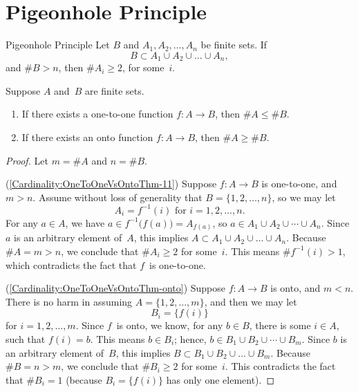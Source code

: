 \documentclass[../MATH-2000-Notes.tex]{subfiles}
\begin{document}
\section{Pigeonhole Principle}
\begin{Proposition}
    {Pigeonhole Principle}
    \label{PigeonholePrinciple}
    Let $B$ and $A_1,A_2,\ldots,A_n$ be finite sets. If
    $$ B \subset A_1 \cup A_2 \cup \ldots \cup A_n ,$$
    and $\#B > n$, then $\#A_i \ge 2$, for some~$i$.
\end{Proposition}
\begin{Corollary}
    \label{Cardinality:OneToOneVsOntoThm}
    Suppose $A$ and~$B$ are finite sets. %
    \begin{enumerate}
        \item \label{Cardinality:OneToOneVsOntoThm-11}
              If there exists a one-to-one function $f \colon A \to B$, then $\#A \le \#B$.
        \item \label{Cardinality:OneToOneVsOntoThm-onto}
              If there exists an onto function $f \colon A \to B$, then $\#A \ge \#B$.
    \end{enumerate}
\end{Corollary}
\begin{proof}
    Let $m = \#A$ and $n = \#B$.

    (\ref{Cardinality:OneToOneVsOntoThm-11})
    Suppose $f \colon A \to B$ is one-to-one, and $m > n$. Assume without loss of generality that $B = \{1,2,\ldots,n\}$, so we may let
    $$ \text{$A_i = f^{-1}(i)$ \ for $i = 1,2,\ldots,n$} . $$
    For any $a \in A$, we have $a \in f^{-1} \bigl( f(a) \bigr) = A_{f(a)}$, so $a \in A_1 \cup A_2 \cup \cdots \cup A_n$. Since $a$ is an arbitrary element of~$A$, this implies $A \subset A_1 \cup A_2 \cup \ldots \cup A_n$. Because $\#A = m > n$, we conclude that $\#A_i \ge 2$ for some~$i$. This means $\#f^{-1}(i) > 1$, which contradicts the fact that $f$~is one-to-one.

    (\ref{Cardinality:OneToOneVsOntoThm-onto})
    Suppose $f\colon A \to B$ is onto, and $m < n$.
    There is no harm in assuming $A = \{1,2,\ldots,m\}$, and then we may let
    $$B_i = \{f(i)\} $$
    for $i = 1,2,\ldots,m$. Since $f$~is onto, we know, for any $b \in B$, there is some $i \in A$, such that $f(i) = b$. This means $b \in B_i$; hence,  $b \in B_1 \cup B_2 \cup \cdots \cup B_m$. Since $b$ is an arbitrary element of~$B$, this implies $B \subset B_1 \cup B_2 \cup \ldots \cup B_m$. Because $\#B = n > m$, we conclude that $\#B_i \ge 2$ for some~$i$. This contradicts the fact that $\#B_i = 1$ (because $B_i =  \{f(i)\}$ has only one element).
\end{proof}
\end{document}
